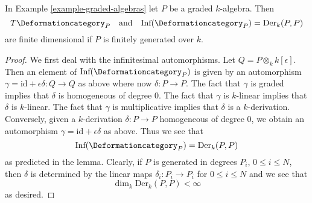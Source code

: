 \begin{lemma}
\label{lemma-graded-algebras-TI}
In Example \ref{example-graded-algebras} let $P$ be a graded $k$-algebra.
Then
$$
T\Deformationcategory_P
\quad\text{and}\quad
\text{Inf}(\Deformationcategory_P) = \text{Der}_k(P, P)
$$
are finite dimensional if $P$ is finitely generated over $k$.
\end{lemma}

\begin{proof}
We first deal with the infinitesimal automorphisms.
Let $Q = P \otimes_k k[\epsilon]$.
Then an element of $\text{Inf}(\Deformationcategory_P)$
is given by an automorphism
$\gamma = \text{id} + \epsilon \delta : Q \to Q$
as above where now $\delta : P \to P$.
The fact that $\gamma$ is graded implies that
$\delta$ is homogeneous of degree $0$.
The fact that $\gamma$ is $k$-linear implies that
$\delta$ is $k$-linear.
The fact that $\gamma$ is multiplicative implies that
$\delta$ is a $k$-derivation.
Conversely, given a $k$-derivation $\delta : P \to P$
homogeneous of degree $0$, we obtain an automorphism
$\gamma = \text{id} + \epsilon \delta$ as above.
Thus we see that
$$
\text{Inf}(\Deformationcategory_P) = \text{Der}_k(P, P)
$$
as predicted in the lemma.
Clearly, if $P$ is generated in degrees $P_i$,
$0 \leq i \leq N$, then $\delta$ is determined by
the linear maps $\delta_i : P_i \to P_i$ for
$0 \leq i \leq N$ and we see that
$$
\dim_k \text{Der}_k(P, P) < \infty
$$
as desired.


\end{proof}

